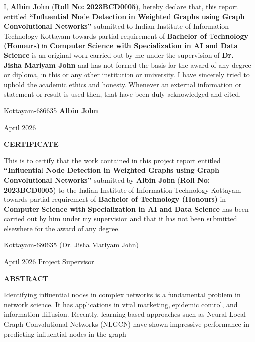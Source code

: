 \documentclass[12pt,a4wide]{report}
\theoremstyle{plain}
\theoremstyle{definition}
\theoremstyle{remark}
\begin{document}
\noindent I, \textbf{Albin John} (\textbf{Roll No: 2023BCD0005}), hereby declare that, this report entitled
\textbf{``Influential Node Detection in Weighted Graphs using Graph Convolutional Networks''} submitted to Indian
Institute of Information Technology Kottayam towards partial
requirement of {\bf Bachelor of Technology (Honours)} in \textbf{Computer Science with Specialization in AI and Data Science}
is an original work carried out by me under the supervision of
\textbf{Dr. Jisha Mariyam John} and has not formed the basis for the award
of any degree or diploma, in this or any other institution or
university. I have sincerely tried to uphold the academic ethics
and honesty. Whenever an external information or statement or
result is used then, that have been duly acknowledged and cited.

\vspace{4cm}

\noindent Kottayam-686635 \hfill \textbf{Albin John}

\noindent April 2026

\clearpage

 \setcounter{page}{3}
\begin{center}
{\large{\bf{CERTIFICATE}}}
\end{center}

\noindent This is to certify that the work contained in this
project report entitled \textbf{``Influential Node Detection in Weighted Graphs using Graph Convolutional Networks''}
submitted by \textbf{Albin John} (\textbf{Roll No: 2023BCD0005}) to the Indian Institute of Information Technology Kottayam
towards partial requirement of {\bf Bachelor of Technology (Honours)} in
\textbf{Computer Science with Specialization in AI and Data Science} has been carried out by him under my
supervision and that it has not been submitted elsewhere for the
award of any degree.

\vspace{4cm}

\noindent Kottayam-686635 \hfill (Dr. Jisha Mariyam John)

\noindent April 2026 \hfill Project Supervisor

\clearpage

\begin{center}
{\Large{\bf{ABSTRACT}}}
\end{center}

Identifying influential nodes in complex networks is a fundamental problem in network science. It has applications in viral marketing, epidemic control, and information diffusion. Recently, learning-based approaches such as Neural Local Graph Convolutional Networks (NLGCN) have shown impressive performance in predicting influential nodes in the graph.
\end{document}
